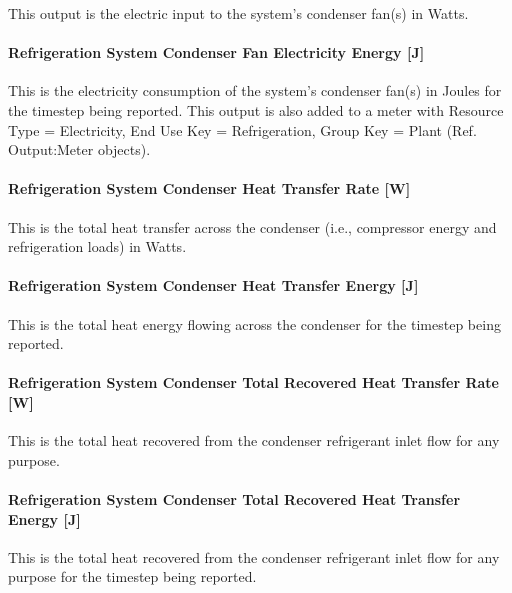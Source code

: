 This output is the electric input to the system's condenser fan(s) in Watts.

\paragraph{Refrigeration System Condenser Fan Electricity Energy {[}J{]}}\label{refrigeration-system-condenser-fan-electric-energy-j}

This is the electricity consumption of the system's condenser fan(s) in Joules for the timestep being reported. This output is also added to a meter with Resource Type = Electricity, End Use Key = Refrigeration, Group Key = Plant (Ref. Output:Meter objects).

\paragraph{Refrigeration System Condenser Heat Transfer Rate {[}W{]}}\label{refrigeration-system-condenser-heat-transfer-rate-w-1}

This is the total heat transfer across the condenser (i.e., compressor energy and refrigeration loads) in Watts.

\paragraph{Refrigeration System Condenser Heat Transfer Energy {[}J{]}}\label{refrigeration-system-condenser-heat-transfer-energy-j-1}

This is the total heat energy flowing across the condenser for the timestep being reported.

\paragraph{Refrigeration System Condenser Total Recovered Heat Transfer Rate~ {[}W{]}}\label{refrigeration-system-condenser-total-recovered-heat-transfer-rate-w-1}

This is the total heat recovered from the condenser refrigerant inlet flow for any purpose.

\paragraph{Refrigeration System Condenser Total Recovered Heat Transfer Energy {[}J{]}}\label{refrigeration-system-condenser-total-recovered-heat-transfer-energy-j-1}

This is the total heat recovered from the condenser refrigerant inlet flow for any purpose for the timestep being reported.

